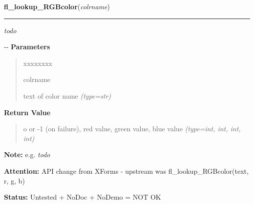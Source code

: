 \hspace{.8\funcindent}\begin{boxedminipage}{\funcwidth}

    \raggedright \textbf{fl\_lookup\_RGBcolor}(\textit{colrname})

    \vspace{-1.5ex}

    \rule{\textwidth}{0.5\fboxrule}
\setlength{\parskip}{2ex}

\emph{todo}

-{}-
\setlength{\parskip}{1ex}
      \textbf{Parameters}
      \vspace{-1ex}

      \begin{quote}
        \begin{Ventry}{xxxxxxxx}

          \item[colrname]


text of color name
            {\it (type=str)}

        \end{Ventry}

      \end{quote}

      \textbf{Return Value}
    \vspace{-1ex}

      \begin{quote}

o or -1 (on failure), red value, green value, blue value
      {\it (type=int, int, int, int)}

      \end{quote}

\textbf{Note:} 
e.g. \emph{todo}


\textbf{Attention:} 
API change from XForms - upstream was
fl\_lookup\_RGBcolor(text, r, g, b)


\textbf{Status:} 
Untested + NoDoc + NoDemo = NOT OK


    \end{boxedminipage}

    \label{xformslib:flflimage:flimage_add_format}

    \vspace{0.5ex}

